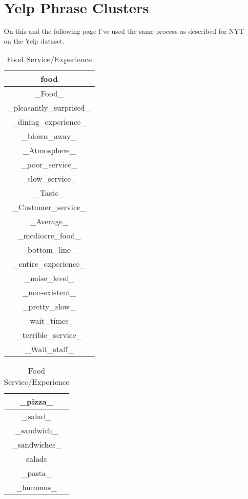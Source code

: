 \documentclass{article}
\begin{document}
\section*{Yelp Phrase Clusters}
On this and the following page I've used the same process as described for NYT on the Yelp dataset.
\begin{table}[ht]
    \parbox{.25\linewidth}{
    \centering
    \begin{tabular}{|c|}
    \hline
    \_food\_\\
    \hline
    \_Food\_\\
    \hline
    \_pleasantly\_surprised\_\\
    \hline
    \_dining\_experience\_\\
    \hline
    \_blown\_away\_\\
    \hline
    \_Atmosphere\_\\
    \hline
    \_poor\_service\_\\
    \hline
    \_slow\_service\_\\
    \hline
    \_Taste\_\\
    \hline
    \_Customer\_service\_\\
    \hline
    \_Average\_\\
    \hline
    \_mediocre\_food\_\\
    \hline
    \_bottom\_line\_\\
    \hline
    \_entire\_experience\_\\
    \hline
    \_noise\_level\_\\
    \hline
    \_non-existent\_\\
    \hline
    \_pretty\_slow\_\\
    \hline
    \_wait\_times\_\\
    \hline
    \_terrible\_service\_\\
    \hline
    \_Wait\_staff\_\\
    \hline
    \end{tabular}
    \caption{Food Service/Experience}
    }
    \hfill
    \parbox{.24\linewidth}{
    \centering
    \begin{tabular}{|c|}
    \hline
    \_pizza\_\\
    \hline
    \_salad\_\\
    \hline
    \_sandwich\_\\
    \hline
    \_sandwiches\_\\
    \hline
    \_salads\_\\
    \hline
    \_pasta\_\\
    \hline
    \_hummus\_\\

\end{tabular}}
\end{table}
\end{document}
